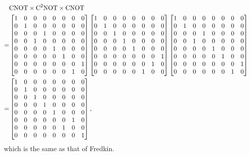 \documentclass[en]{sol-man}
\begin{document}
\begin{sol}
\begin{itemize}
\begin{align}
            \notag&\text{CNOT}\times\text{C}^2\text{NOT}\times\text{CNOT}\\
            \notag=&\begin{bmatrix}
                1&0&0&0&0&0&0&0\\
                0&1&0&0&0&0&0&0\\
                0&0&0&1&0&0&0&0\\
                0&0&1&0&0&0&0&0\\
                0&0&0&0&1&0&0&0\\
                0&0&0&0&0&1&0&0\\
                0&0&0&0&0&0&0&1\\
                0&0&0&0&0&0&1&0
            \end{bmatrix}\begin{bmatrix}
                1&0&0&0&0&0&0&0\\
                0&1&0&0&0&0&0&0\\
                0&0&1&0&0&0&0&0\\
                0&0&0&1&0&0&0&0\\
                0&0&0&0&1&0&0&0\\
                0&0&0&0&0&0&0&1\\
                0&0&0&0&0&0&1&0\\
                0&0&0&0&0&1&0&0
            \end{bmatrix}\begin{bmatrix}
                1&0&0&0&0&0&0&0\\
                0&1&0&0&0&0&0&0\\
                0&0&0&1&0&0&0&0\\
                0&0&1&0&0&0&0&0\\
                0&0&0&0&1&0&0&0\\
                0&0&0&0&0&1&0&0\\
                0&0&0&0&0&0&0&1\\
                0&0&0&0&0&0&1&0
            \end{bmatrix}\\
            =&\begin{bmatrix}
                1&0&0&0&0&0&0&0\\
                0&1&0&0&0&0&0&0\\
                0&0&1&0&0&0&0&0\\
                0&0&0&1&0&0&0&0\\
                0&0&0&0&1&0&0&0\\
                0&0&0&0&0&0&1&0\\
                0&0&0&0&0&1&0&0\\
                0&0&0&0&0&0&0&1
            \end{bmatrix},
        \end{align}
        which is the same as that of Fredkin.


\end{itemize}
\end{sol}
\end{document}
